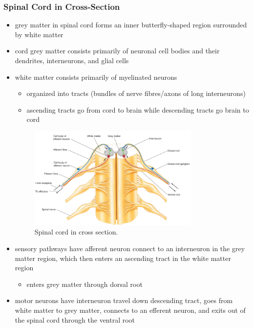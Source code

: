\documentclass[10pt]{article}
\begin{document}
\subsubsection{Spinal Cord in Cross-Section}
\begin{itemize}
    \item grey matter in spinal cord forms an inner butterfly-shaped region surrounded by white matter
    \item cord grey matter consists primarily of neuronal cell bodies and their dendrites, interneurons, and glial cells
    \item white matter consists primarily of myelinated neurons
        \begin{itemize}
            \item organized into tracts (bundles of nerve fibres/axons of long interneurons)
            \item ascending tracts go from cord to brain while descending tracts go brain to cord
        \end{itemize}
        \begin{figure}[h]
            \centering
            \includegraphics[width=0.8\textwidth]{spinalCordCrossSection}
            \caption{Spinal cord in cross section.}
            \label{fig:spinalCordCrossSection}
        \end{figure}
    \item sensory pathways have afferent neuron connect to an interneuron in the grey matter region, which then enters an ascending tract in the white matter region
        \begin{itemize}
            \item enters grey matter through dorsal root
        \end{itemize}
    \item motor neurons have interneuron travel down descending tract, goes from white matter to grey matter, connects to an efferent neuron, and exits out of the spinal cord through the ventral root
\end{itemize}
\end{document}
